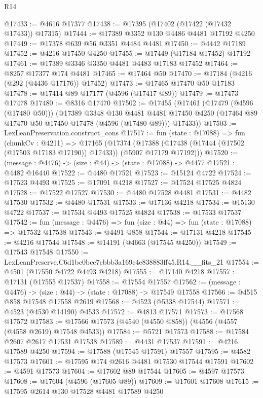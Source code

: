 \begin{lexlean}{R14}
\begin{coremodule}
@17433 := @4616 @17377
@17438 := @17395 (@17402 (@17422 (@17432 @17433)) @17315)
@17444 := @17389 @3352 @130 @4486 @4481 @17192 @4250
@17449 := @17378 @639 @56 @3351 @4484 @4481
@17450 := @4442 @17189
@17452 := @4216 @17450 @4250
@17455 := @17449 (@17184 @17452) @17192
@17461 := @17389 @3346 @3350 @4481 @4483 @17183 @17452
@17464 := @8257 @17377 @174 @4481
@17465 := @17464 @50
@17470 := @17184 (@4216 (@292 (@4436 @17176)) @17452)
@17473 := @17465 @17470 @50 @17183
@17478 := @17414 @89 @17177 (@4596 (@17417 @89))
@17479 := @17473 @17478
@17480 := @8316 @17470
@17502 := @17455
    (@17461
      (@17479 (@4596 (@17480 @50)))
      (@17389
        @3348
        @130
        @4481
        @4481
        @17450
        @4250
        (@17464 @89 @17470 @50 @17450 @17478 (@4596 (@17480 @89)))
        @17433))
@17503 := LexLeanPreservation.construct_cons
@17517 := fun (state : @17088) =>
  fun (chunkCv : @4211) =>
  @17165
    (@17374 (@17388 (@17438 (@17444 (@17502 (@17503 @17183 @17190)) @17433)) (@5907 @17179 @17192)))
@17520 := (message : @4476) -> (size : @44) -> (state : @17088) -> @4477
@17521 := @4482 @16440
@17522 := @4480 @17521
@17523 := @15124 @4722
@17524 := @17523 @4493
@17525 := @17091 @4218
@17527 := @17524 @17525 @4824
@17528 := @17522 @17527
@17530 := @4480 @17528 @4481
@17531 := @4482 @17530
@17532 := @4480 @17531
@17533 := @17136 @4218
@17534 := @15130 @4722
@17537 := @17534 @4493 @17525 @4824
@17538 := @17533 @17537
@17542 := fun (message : @4476) => fun (size : @44) => fun (state : @17088) => @17532 @17538
@17543 := @4491 @858
@17544 := @17131 @4218
@17545 := @4216 @17544
@17548 := @14191 (@4663 (@17545 @4250))
@17549 := @17543 @17548
@17550 := LexLeanPreserve.C6d1bc0bcc7cbbb3a169c4e838883ff45.R14.__fits_21
@17554 := @4501 (@17550 @4722 @4493 @4218)
@17555 := @17140 @4218
@17557 := @17131 (@17555 @17537)
@17558 := @17554 @17557
@17562 := (message : @4476) -> (size : @44) -> (state : @17088) -> @17549 @17558
@17566 := @4515 @858 @17548 @17558 @2619
@17568 := @4523 (@5338 @17544)
@17571 := @4523 (@4530 @14190) @4533
@17572 := @4813 @17571
@17573 := @17568 @17572
@17583 := @17566 @17573 (@4540 (@4550 @858)) (@4556 (@4557 (@4558 @2619) @17548 @4533))
@17584 := @5721 @17573
@17588 := @17584 @2607 @2617 @17531 @17538
@17589 := @4431 @17537
@17591 := @4216 @17589 @4250
@17594 := @17588 (@17545 @17591) @17557
@17595 := @4582 @17573
@17601 := @17595 @174 @2616 @4481 @17530 @17544 @17591
@17602 := @4591 @17573
@17604 := @17602 @89 @17544
@17605 := @4597 @17573
@17608 := @17604 (@4596 (@17605 @89))
@17609 := @17601 @17608
@17615 := @17595 @2614 @130 @17528 @4481 @17589 @4250

\end{coremodule}
\end{lexlean}
